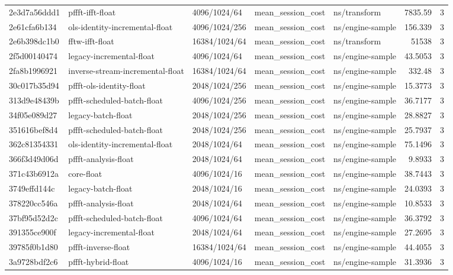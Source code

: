 \begin{longtable}{lllllrr}
2e3d7a56ddd1 & pffft-ifft-float & 4096/1024/64 & mean\_session\_cost & ns/transform & 7835.59 & 3 \\
2e61cfa6b134 & ols-identity-incremental-float & 4096/1024/256 & mean\_session\_cost & ns/engine-sample & 156.339 & 3 \\
2e6b398dc1b0 & fftw-ifft-float & 16384/1024/64 & mean\_session\_cost & ns/transform & 51538 & 3 \\
2f5d00140474 & legacy-incremental-float & 4096/1024/64 & mean\_session\_cost & ns/engine-sample & 43.5053 & 3 \\
2fa8b1996921 & inverse-stream-incremental-float & 16384/1024/64 & mean\_session\_cost & ns/engine-sample & 332.48 & 3 \\
30c017b35d94 & pffft-ols-identity-float & 2048/1024/256 & mean\_session\_cost & ns/engine-sample & 15.3773 & 3 \\
313d9e48439b & pffft-scheduled-batch-float & 4096/1024/256 & mean\_session\_cost & ns/engine-sample & 36.7177 & 3 \\
34f05e089d27 & legacy-batch-float & 2048/1024/256 & mean\_session\_cost & ns/engine-sample & 28.8827 & 3 \\
351616bef8d4 & pffft-scheduled-batch-float & 2048/1024/256 & mean\_session\_cost & ns/engine-sample & 25.7937 & 3 \\
362c81354331 & ols-identity-incremental-float & 2048/1024/64 & mean\_session\_cost & ns/engine-sample & 75.1496 & 3 \\
366f3d49d06d & pffft-analysis-float & 2048/1024/64 & mean\_session\_cost & ns/engine-sample & 9.8933 & 3 \\
371c43b6912a & core-float & 4096/1024/16 & mean\_session\_cost & ns/engine-sample & 38.7443 & 3 \\
3749effd144c & legacy-batch-float & 2048/1024/16 & mean\_session\_cost & ns/engine-sample & 24.0393 & 3 \\
378220cc546a & pffft-analysis-float & 2048/1024/64 & mean\_session\_cost & ns/engine-sample & 10.8533 & 3 \\
37bf95d52d2c & pffft-scheduled-batch-float & 4096/1024/64 & mean\_session\_cost & ns/engine-sample & 36.3792 & 3 \\
391355ce900f & legacy-incremental-float & 2048/1024/64 & mean\_session\_cost & ns/engine-sample & 27.2695 & 3 \\
39785f0b1d80 & pffft-inverse-float & 16384/1024/64 & mean\_session\_cost & ns/engine-sample & 44.4055 & 3 \\
3a9728bdf2c6 & pffft-hybrid-float & 4096/1024/16 & mean\_session\_cost & ns/engine-sample & 31.3936 & 3 \\

\end{longtable}
